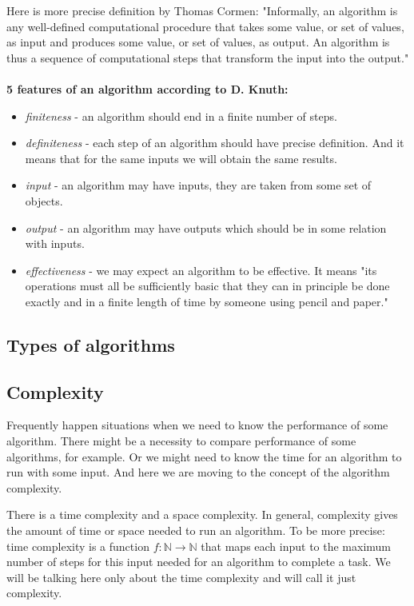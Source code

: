 \documentclass[
  field=inf,
  biblatex,
  language=english,
  glossaries,
  index
]{kidiplom}
\begin{document}
Here is more precise definition by Thomas Cormen: "Informally, an algorithm is any well-defined computational procedure that takes some value, or set of values, as input and produces some value, or set of values, as output. An algorithm is thus a sequence of computational steps that transform the input into the output." \cite{cormen}
\\\\
\textbf{5 features of an algorithm according to D. Knuth\cite{knuth1}:}
\begin{itemize}
	\item \textit{finiteness} - an algorithm should end in a finite number of steps.
	\item \textit{definiteness} - each step of an algorithm should have precise definition. And it means that for the same inputs we will obtain the same results.
	\item \textit{input} - an algorithm may have inputs, they are taken from some set of objects.
	\item \textit{output} - an algorithm may have outputs which should be in some relation with inputs.
	\item \textit{effectiveness} - we may expect an algorithm to be effective. It means "its operations must all be sufficiently basic that they can in principle be done exactly and in a finite length of time by someone using pencil and paper."\cite{knuth1}
\end{itemize}

\subsection{Types of algorithms}

\subsection{Complexity}

Frequently happen situations when we need to know the performance of some algorithm. There might be a necessity to compare performance of some algorithms, for example. Or we might need to know the time for an algorithm to run with some input. And here we are moving to the concept of the algorithm complexity.

There is a time complexity and a space complexity. In general, complexity gives the amount of time or space needed to run an algorithm. To be more precise: time complexity is a function $f:\mathbb{N}\to\mathbb{N}$ that maps each input to the maximum number of steps for this input needed for an algorithm to complete a task. We will be talking here only about the time complexity and will call it just complexity.
\end{document}
